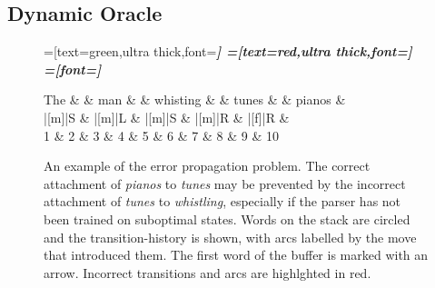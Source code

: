 \documentclass[11pt,letterpaper]{article}
\begin{document}
\subsection{Dynamic Oracle}
\begin{figure}
\begin{dependency}[theme=simple]

=[text=green,ultra thick,font=\bfseries\itshape]
=[text=red,ultra thick,font=\bfseries\itshape]
=[font=\bfseries\itshape]

\begin{deptext}[column sep=.1cm, row sep=.1ex]
 The \&   \& man    \&      \& whisting \&    \& tunes \&    \& pianos \& \\
|[m]|S \& |[m]|L \& |[m]|S \& |[m]|R \& |[f]|R \& \\
    1   \& 2 \& 3      \& 4    \& 5         \& 6 \&   7    \& 8 \&    9    \& 10 \\
\end{deptext}

\end{dependency}
\caption{
An example of the error propagation problem.
The correct attachment of \emph{pianos} to \emph{tunes} may be
prevented by the incorrect attachment of \emph{tunes} to \emph{whistling},
especially if the parser has not been trained on suboptimal states.
Words on the stack are circled and the transition-history is shown, with arcs
labelled by the move that introduced them. The first word of the buffer is marked
with an arrow. Incorrect transitions and arcs are highlghted in red.
\label{fig:whistling_tunes}}
\end{figure}

\pagebreak


\end{document}
